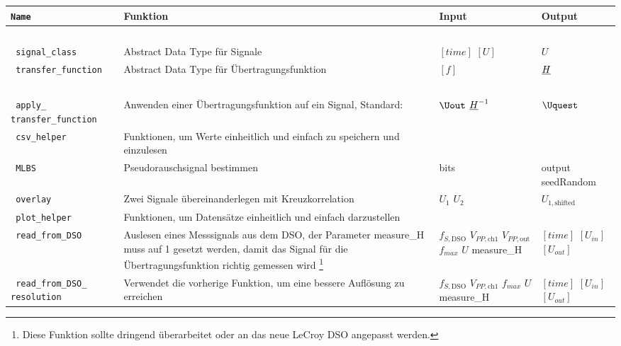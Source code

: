 \documentclass[../Report.tex]{subfiles}
\begin{document}
\begin{table}[H]
\centering 
\begin{tabular}[t]{| >{\texttt\bgroup}m{3.5cm}<{\egroup}|m{8cm}|m{2cm}|m{2cm}|} 
  \hline
    \textrm{\textbf{Name}} & \textbf{Funktion} & \textbf{Input} & \textbf{Output} \\ 
  \hline \hline
    \multicolumn{4}{|c|}{\textbf{classes}} \\
  \hline \hline
  signal\_class & Abstract Data Type für Signale & $[time]$ \newline $[U]$  & $U$\\
  \hline
  transfer\_function & Abstract Data Type für Übertragungsfunktion & $[f]$ & $\underline{H}$\\
  \hline \hline
    \multicolumn{4}{|c|}{\textbf{helpers}} \\
  \hline \hline
  apply\_ \newline transfer\_function & Anwenden einer Übertragungsfunktion auf ein Signal, Standard:  & $\Uout$ \newline $\underline{H}^{-1}$  & $\Uquest$\\
  \hline
  csv\_helper & Funktionen, um Werte einheitlich und einfach zu speichern und einzulesen &  & \\
  \hline
  MLBS & Pseudorauschsignal bestimmen & bits & output \newline seedRandom\\
  \hline
  overlay & Zwei Signale übereinanderlegen mit Kreuzkorrelation & $U_1$ \newline $U_2$ & $U_{1,\textrm{shifted}}$\\
  \hline
  plot\_helper & Funktionen, um Datensätze einheitlich und einfach darzustellen & & \\
  \hline
  read\_from\_DSO & Auslesen eines Messsignals aus dem DSO, der Parameter measure\_H muss auf 1 gesetzt werden, damit das Signal für die Übertragungsfunktion richtig gemessen wird \footnote{Diese Funktion sollte dringend überarbeitet oder an das neue LeCroy DSO angepasst werden.} & $f_{S,\textrm{DSO}}$ \newline $V_{PP,\textrm{ch1}}$ \newline $V_{PP,\textrm{out}}$ \newline $f_{max}$ \newline $U$ \newline measure\_H & $[time]$ \newline $[U_{in}]$ \newline $[U_{out}]$\\
  \hline
  read\_from\_DSO\_ \newline resolution & Verwendet die vorherige Funktion, um eine bessere Auflösung zu erreichen & $f_{S,\textrm{DSO}}$ \newline $V_{PP,\textrm{ch1}}$ \newline $f_{max}$ \newline $U$ \newline measure\_H & $[time]$ \newline $[U_{in}]$ \newline $[U_{out}]$\\

\end{tabular}
\end{table}
\end{document}
